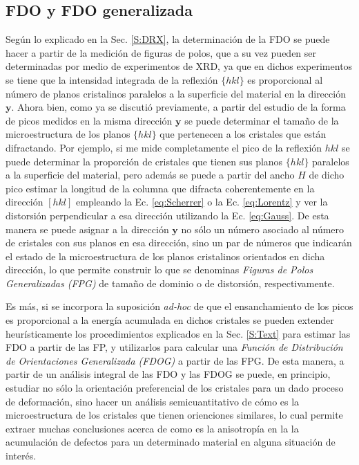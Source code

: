 \subsection{FDO y FDO generalizada}\label{SS:ODFG}
Según lo explicado en la Sec. \ref{S:DRX}, la determinación de la FDO se puede hacer a partir de la medición de figuras de polos, que a su vez pueden ser determinadas por medio de experimentos de XRD, ya que en dichos experimentos se tiene que la intensidad integrada de la reflexión $\{hkl\}$ es proporcional al número de planos cristalinos paralelos a  la superficie del material en la dirección $\mathbf{y}$.
Ahora bien, como ya se discutió previamente, a partir del estudio de la forma de picos medidos en la misma dirección $\mathbf{y}$ se puede determinar el tamaño de la microestructura de los planos $\{hkl\}$ que pertenecen a los cristales que están difractando.
Por ejemplo, si me mide completamente el pico de la reflexión $hkl$ se puede determinar la proporción de cristales que tienen sus planos $\{hkl\}$ paralelos a la superficie del material, pero además se puede a partir del ancho $H$ de dicho pico estimar la longitud de la columna que difracta coherentemente en la dirección $[hkl]$ empleando la Ec. \ref{eq:Scherrer} o la Ec. \ref{eq:Lorentz} y ver la distorsión perpendicular a esa dirección utilizando la Ec. \ref{eq:Gauss}.
De esta manera se puede asignar a la dirección $\mathbf{y}$ no sólo un número asociado al número de cristales con sus planos en esa dirección, sino un par de números que indicarán el estado de la microestructura de los planos cristalinos orientados en dicha dirección, lo que permite construir lo que se denominas \textit{Figuras de Polos Generalizadas (FPG)} de tamaño de dominio o de distorsión, respectivamente.

Es más, si se incorpora la suposición \textit{ad-hoc} de que el ensanchamiento de los picos es proporcional a la energía acumulada en dichos cristales se pueden extender heurísticamente los procedimientos explicados en la Sec. \ref{S:Text} para estimar las FDO a partir de las FP, y utilizarlos para calcular una \textit{Función de Distribución de Orientaciones Generalizada (FDOG)} a partir de las FPG. 
De esta manera, a partir de un análisis integral de las FDO y las FDOG se puede, en principio, estudiar no sólo la orientación preferencial de los cristales para un dado proceso de deformación, sino hacer un análisis semicuantitativo de cómo es la microestructura de los cristales que tienen orienciones similares, lo cual permite extraer muchas conclusiones acerca de como es la anisotropía en la la acumulación de defectos para un determinado material en alguna situación de interés. 
 
